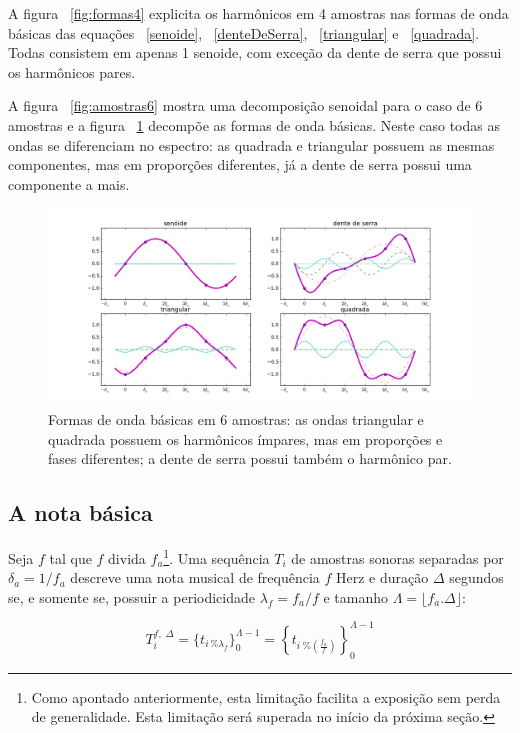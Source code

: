 A figura ~\ref{fig:formas4} explicita os harmônicos em 4 amostras nas formas de onda básicas das equações ~\ref{senoide}, ~\ref{denteDeSerra}, ~\ref{triangular} e ~\ref{quadrada}. Todas consistem em apenas 1 senoide, com exceção da dente de serra que possui os harmônicos pares.


A figura ~\ref{fig:amostras6} mostra uma decomposição senoidal para o caso de 6 amostras e a figura ~\ref{fig:formas6} decompõe as formas de onda básicas.
 Neste caso todas as ondas se diferenciam no espectro: as quadrada e triangular possuem as mesmas componentes, mas em proporções diferentes, já a dente de serra possui uma componente a mais.

\begin{figure}[h!]
    \centering
        \includegraphics[width=\textwidth]{figuras/amostras6formas___}
    \caption{Formas de onda básicas em 6 amostras: as ondas triangular e quadrada possuem os harmônicos ímpares, mas em proporções e fases diferentes; a dente de serra possui também o harmônico par.}
        \label{fig:formas6}
\end{figure}



\subsection{A nota básica}\label{notaBasica}

Seja $f$ tal que $f$ divida $f_a$\footnote{Como apontado anteriormente, esta limitação facilita a exposição sem perda de generalidade.
Esta limitação será superada no início da próxima seção.}.
Uma sequência $T_i$ de amostras sonoras separadas por $\delta_a=1/f_a$ descreve uma nota musical de frequência $f$ Herz e duração $\Delta$ segundos se, e somente se, possuir a periodicidade $\lambda_f=f_a/f$
 e tamanho $\Lambda=\lfloor f_a . \Delta \rfloor $:

\begin{equation}
T_i^{f,\; \Delta}=\{t_{i \, \% \lambda_f} \}_0^{\Lambda-1}= \left \{t_{i \; \% \left( \frac{f_a}{f} \right) } \right \}_0^{\Lambda-1}
\end{equation}

